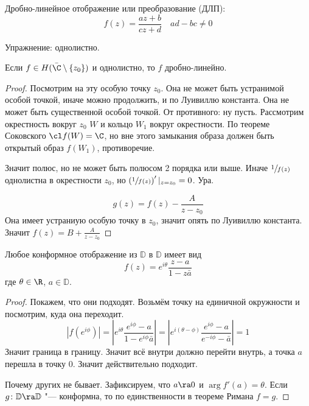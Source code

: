 \begin{Def}
	Дробно-линейное отображение или преобразование (ДЛП):
	\[ f(z) = \frac{az+b}{cz+d} \quad ad-bc \ne 0 \]
\end{Def}

Упражнение: однолистно.

\begin{theorem}
	Если $f \in H(\bar \C \setminus \{z_0\})$ и однолистно, то $f$ дробно-линейно.
\end{theorem}
\begin{proof}
	Посмотрим на эту особую точку $z_0$.
	Она не может быть устранимой особой точкой, иначе можно продолжить, и по Луивиллю константа.
	Она не может быть существенной особой точкой.
	От противного: ну пусть. Рассмотрим окрестность вокруг $z_0$ $W$ и кольцо $W_1$ вокруг окрестности.
	По теореме Соковского $\cl f(W) = \C$, но вне этого замыкания образа должен быть открытый образ $f(W_1)$, противоречие.

	Значит полюс, но не может быть полюсом 2 порядка или выше.
	Иначе $\sfrac 1{f(z)}$ однолистна в окрестности $z_0$, но $\left(\sfrac 1{f(z)}\right)'|_{z=z_0} = 0$.
	Ура.

	\[ g(z) = f(z) - \frac A{z - z_0} \]
	Она имеет устраниую особую точку в $z_0$, значит опять по Луивиллю константа.
	Значит $f(z) = B + \frac A{z-z_0}$
\end{proof}

\begin{theorem}
	Любое конформное отображение из $\mathbb D$ в $\mathbb D$ имеет вид
	\[ f(z) = e^{i\theta} \frac{z-a}{1-z\bar a} \]
	где $\theta \in \R$, $a \in \mathbb D$.
\end{theorem}
\begin{proof}
	Покажем, что они подходят.
	Возьмём точку на единичной окружности и посмотрим, куда она переходит.
	\[ 
		\left| f(e^{i\phi}) \right|
		= \left| e^{i\theta} \frac{e^{i\phi} - a}{1-e^{i\phi}\bar a} \right|
		= \left| e^{i(\theta - \phi)} \frac{e^{i\phi} - a}{e^{-i\phi} - \bar a}\right|
		= 1
	\]
	Значит граница в границу. Значит всё внутри должно перейти внутрь, а точка $a$ перешла в точку $0$.
	Значит действительно подходит.

	Почему других не бывает. Зафиксируем, что $a \ra 0$ и $\arg f'(a) = \theta$.
	Если $g \colon \mathbb D \ra \mathbb D$ "--- конформна, то по единственности в теореме Римана $f = g$.
\end{proof}

